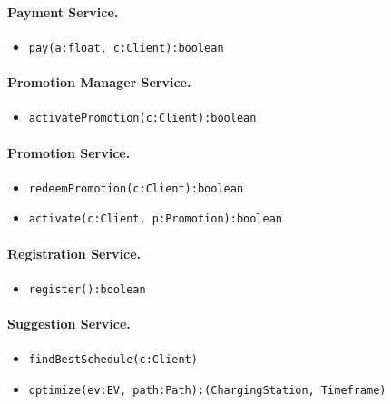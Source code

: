 \paragraph{Payment Service.}
\begin{itemize}
    \item \verb|pay(a:float, c:Client):boolean|
\end{itemize}

\paragraph{Promotion Manager Service.}
\begin{itemize}
    \item \verb|activatePromotion(c:Client):boolean|
\end{itemize}

\paragraph{Promotion Service.}
\begin{itemize}
    \item \verb|redeemPromotion(c:Client):boolean|
    \item \verb|activate(c:Client, p:Promotion):boolean|
\end{itemize}

\paragraph{Registration Service.}
\begin{itemize}
    \item \verb|register():boolean|
\end{itemize}

\paragraph{Suggestion Service.}
\begin{itemize}
    \item \verb|findBestSchedule(c:Client)|
    \item \verb|optimize(ev:EV, path:Path):(ChargingStation, Timeframe)|
\end{itemize}


